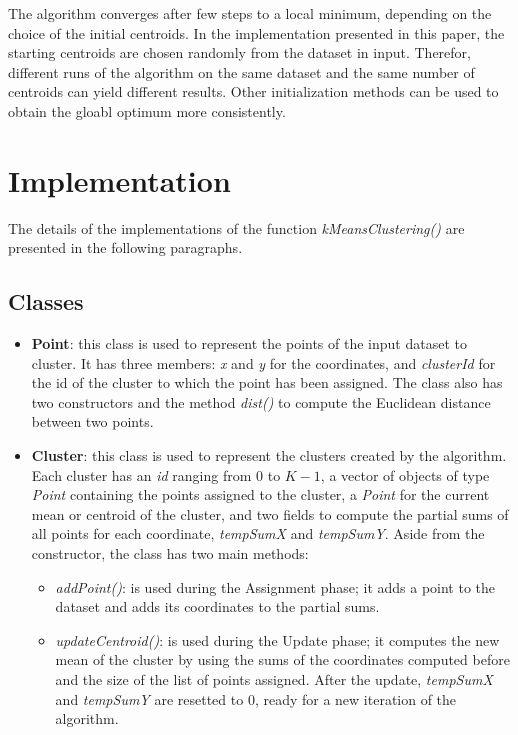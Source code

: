 \documentclass[10pt,twocolumn,letterpaper]{article}
\begin{document}
The algorithm converges after few steps to a local minimum, depending on the choice of the initial centroids. In the implementation presented in this paper, the starting centroids are chosen randomly from the dataset in input. Therefor, different runs of the algorithm on the same dataset and the same number of centroids can yield different results. Other initialization methods can be used to obtain the gloabl optimum more consistently.


\section{Implementation}
The details of the implementations of the function \textit{kMeansClustering()} are presented in the following paragraphs.

\subsection{Classes}
\begin{itemize}
	\item \textbf{Point}: this class is used to represent the points of the input dataset to cluster. It has three members: \textit{x} and \textit{y} for the coordinates, and \textit{clusterId} for the id of the cluster to which the point has been assigned. 
	The class also has two constructors and the method \textit{dist()} to compute the Euclidean distance between two points.
	\item \textbf{Cluster}: this class is used to represent the clusters created by the algorithm. Each cluster has an \textit{id} ranging from 0 to $K - 1$, a vector of objects of type \textit{Point} containing the points assigned to the cluster, a \textit{Point} for the current mean or centroid of the cluster, and two fields to compute the partial sums of all points for each coordinate, \textit{tempSumX} and \textit{tempSumY}.
	Aside from the constructor, the class has two main methods:
	\begin{itemize}
		\item \textit{addPoint()}: is used during the Assignment phase; it adds a point to the dataset and adds its coordinates to the partial sums.
		\item \textit{updateCentroid()}: is used during the Update phase; it computes the new mean of the cluster by using the sums of the coordinates computed before and the size of the list of points assigned. After the update, \textit{tempSumX} and \textit{tempSumY} are resetted to 0, ready for a new iteration of the algorithm.
	\end{itemize}
\end{itemize}
\end{document}
